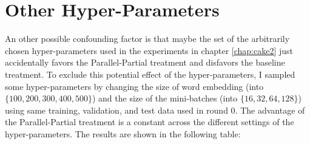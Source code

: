 \documentclass[final]{ua-thesis}
\numberwithin{equation}{section}
\begin{document}
\section{Other Hyper-Parameters}
An other possible confounding factor is that maybe the set of the arbitrarily chosen hyper-parameters used in the experiments in chapter \ref{chap:cake2} just accidentally favors the Parallel-Partial treatment and disfavors the baseline treatment. To exclude this potential effect of the hyper-parameters, I sampled some hyper-parameters by changing the size of word embedding (into $\{100, 200, 300, 400, 500\}$) and the size of the mini-batches (into $\{16, 32, 64, 128\}$) using same training, validation, and test data used in round 0. The advantage of the Parallel-Partial treatment is a constant across the different settings of the hyper-parameters. The results are shown in the following table:  
\end{document}
